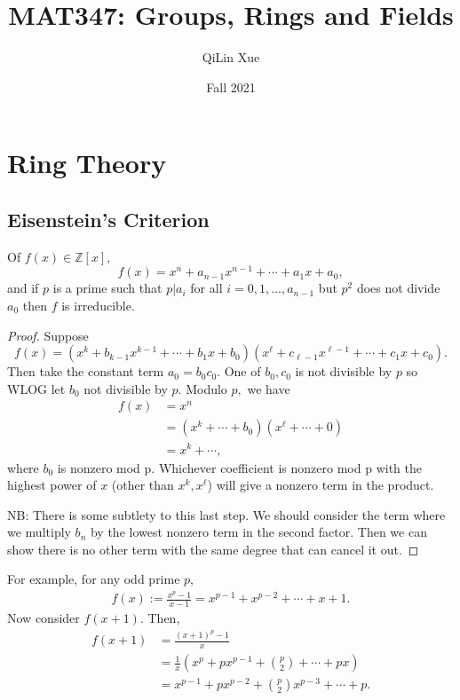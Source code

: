 \documentclass{article}
\title{MAT347: Groups, Rings and Fields}
\author{QiLin Xue}
\date{Fall 2021}
\numberwithin{equation}{section}
\begin{document}
\maketitle
\tableofcontents
\newpage
\section{Ring Theory}
\subsection{Eisenstein's Criterion}
\begin{lemma}
     Of $f(x) \in \mathbb{Z}[x],$
    \begin{equation*}
        f(x) = x^n + a_{n-1}x^{n-1} + \cdots + a_1x+a_0,
    \end{equation*}
    and if $p$ is a prime such that $p|a_i$ for all $i=0,1,\dots,a_{n-1}$ but $p^2$ does not divide $a_0$ then $f$ is irreducible.
\end{lemma}
\begin{proof}
    Suppose
    $$f(x) = (x^k+b_{k-1}x^{k-1}+\cdots + b_1x+b_0)(x^{\ell} + c_{\ell-1}x^{\ell-1}+\cdots+c_1 x + c_0).$$
    Then take the constant term $a_0=b_0c_0.$ One of $b_0,c_0$ is not divisible by $p$ so WLOG let $b_0$ not divisible by $p.$ Modulo $p,$ we have 
    \begin{align*}
        f(x)&=x^n \\ 
        &= (x^k+\cdots +b_0)(x^{\ell}+\cdots + 0) \\ 
        &= x^k + \cdots,
    \end{align*}
    where $b_0$ is nonzero mod p. Whichever coefficient is nonzero mod p with the highest power of $x$ (other than $x^k,x^\ell$) will give a nonzero term in the product.
    \vspace{2mm}

    NB: There is some subtlety to this last step. We should consider the term where we multiply $b_n$ by the lowest nonzero term in the second factor. Then we can show there is no other term with the same degree that can cancel it out. 
\end{proof}
For example, for any odd prime $p,$
\begin{align*}
    f(x) := \frac{x^p-1}{x-1} = x^{p-1} + x^{p-2} + \cdots + x + 1.
\end{align*}
Now consider $f(x+1).$ Then,
\begin{align*}
    f(x+1) &= \frac{(x+1)^p-1}{x} \\ 
    &= \frac{1}{x}\left(x^{p} + px^{p-1} + \binom{p}{2} + \cdots + px\right) \\ 
    &= x^{p-1} + px^{p-2} + \binom{p}{2}x^{p-3}+\cdots + p.
\end{align*}
\end{document}
